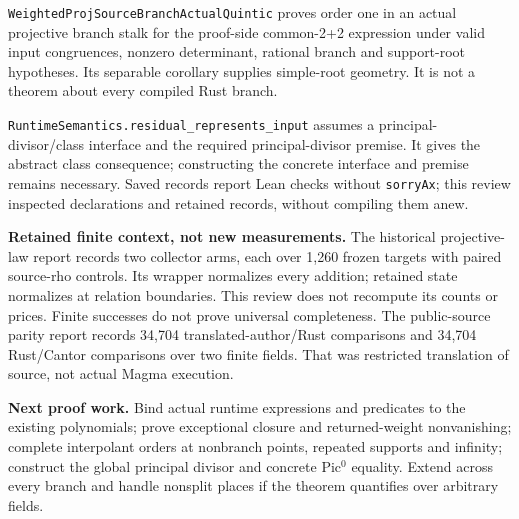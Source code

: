 \documentclass[11pt]{article}
\begin{document}
\texttt{WeightedProjSourceBranchActualQuintic} proves order one in an actual projective branch stalk for the proof-side common-2+2 expression under valid input congruences, nonzero determinant, rational branch and support-root hypotheses. Its separable corollary supplies simple-root geometry. It is not a theorem about every compiled Rust branch.

\texttt{RuntimeSemantics.residual\_represents\_input} assumes a principal-divisor/class interface and the required principal-divisor premise. It gives the abstract class consequence; constructing the concrete interface and premise remains necessary. Saved records report Lean checks without \texttt{sorryAx}; this review inspected declarations and retained records, without compiling them anew.

\textbf{Retained finite context, not new measurements.} The historical projective-law report records two collector arms, each over 1,260 frozen targets with paired source-rho controls. Its wrapper normalizes every addition; retained state normalizes at relation boundaries. This review does not recompute its counts or prices. Finite successes do not prove universal completeness. The public-source parity report records 34,704 translated-author/Rust comparisons and 34,704 Rust/Cantor comparisons over two finite fields. That was restricted translation of source, not actual Magma execution.

\textbf{Next proof work.} Bind actual runtime expressions and predicates to the existing polynomials; prove exceptional closure and returned-weight nonvanishing; complete interpolant orders at nonbranch points, repeated supports and infinity; construct the global principal divisor and concrete Pic$^0$ equality. Extend across every branch and handle nonsplit places if the theorem quantifies over arbitrary fields.
\end{document}

